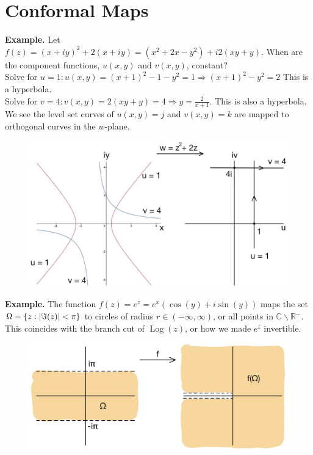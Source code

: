 \documentclass[11pt]{article}
\DeclarePairedDelimiter\abs{\lvert}{\rvert}
\begin{document}
\section{Conformal Maps}
\textbf{Example.} Let $f(z) = (x + iy)^2 + 2(x +iy) = \left(x^2 + 2x - y^2\right) + i2(xy + y)$. When are the component functions, $u(x, y)$ and $v(x, y)$, constant? \\
Solve for $u = 1: u(x, y) = (x + 1)^2 - 1 - y^2 = 1 \Rightarrow (x + 1)^2 - y^2 = 2 $ This is a hyperbola. \\
Solve for $v = 4: v(x, y) = 2(xy + y) = 4 \Rightarrow y = \frac{2}{x + 1}$. This is also a hyperbola. \\ 
We see the level set curves of $u(x, y) = j$ and $v(x, y) = k$ are mapped to orthogonal curves in the $w$-plane. \\
\begin{figure}[H]
\includegraphics[scale = 0.2]{9_1}
\centering
\end{figure}
\textbf{Example.} The function $f(z) = e^z = e^x\left(\cos(y) + i\sin(y)\right)$ maps the set $\Omega = \{z: \abs{\Im(z)} < \pi \}$ to circles of radius $r \in (-\infty, \infty)$, or all points in $\mathbb{C} \backslash \mathbb{R}^-$. This coincides with the branch cut of $\operatorname{Log}(z)$, or how we made $e^z$ invertible. \\
\begin{figure}[H]
\includegraphics[scale = 0.2]{9_2}
\centering
\end{figure}
\end{document}
